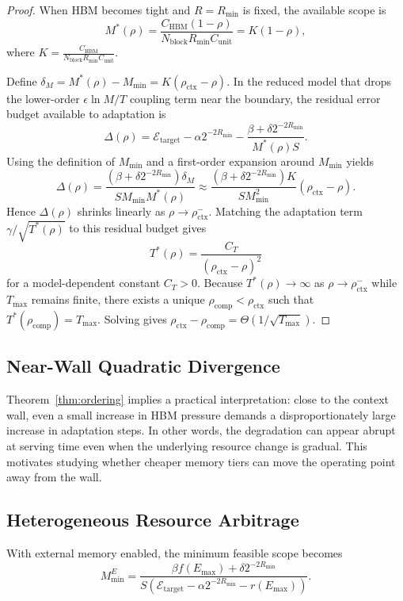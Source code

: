 \documentclass[11pt,a4paper]{article}
\theoremstyle{plain}
\theoremstyle{definition}
\begin{document}
\begin{proof}
When HBM becomes tight and $R=R_{\min}$ is fixed, the available scope is
\[
M^*(\rho) = \frac{C_{\text{HBM}}(1-\rho)}{N_{\text{block}}R_{\min}C_{\text{unit}}} = K(1-\rho),
\]
where $K = \frac{C_{\text{HBM}}}{N_{\text{block}}R_{\min}C_{\text{unit}}}$.

Define $\delta_M = M^*(\rho)-M_{\min} = K(\rho_{\text{ctx}}-\rho)$. In the reduced model that drops the lower-order $\epsilon \ln M / T$ coupling term near the boundary, the residual error budget available to adaptation is
\[
\Delta(\rho) = \mathcal{E}_{\text{target}} - \alpha 2^{-2R_{\min}} - \frac{\beta + \delta 2^{-2R_{\min}}}{M^*(\rho)S}.
\]
Using the definition of $M_{\min}$ and a first-order expansion around $M_{\min}$ yields
\[
\Delta(\rho) = \frac{(\beta + \delta 2^{-2R_{\min}})\delta_M}{S M_{\min}M^*(\rho)}
\approx \frac{(\beta + \delta 2^{-2R_{\min}})K}{S M_{\min}^2}(\rho_{\text{ctx}}-\rho).
\]
Hence $\Delta(\rho)$ shrinks linearly as $\rho \to \rho_{\text{ctx}}^{-}$. Matching the adaptation term $\gamma/\sqrt{T^*(\rho)}$ to this residual budget gives
\[
T^*(\rho)=\frac{C_T}{(\rho_{\text{ctx}}-\rho)^2}
\]
for a model-dependent constant $C_T>0$. Because $T^*(\rho)\to\infty$ as $\rho\to\rho_{\text{ctx}}^{-}$ while $T_{\max}$ remains finite, there exists a unique $\rho_{\text{comp}}<\rho_{\text{ctx}}$ such that $T^*(\rho_{\text{comp}})=T_{\max}$. Solving gives $\rho_{\text{ctx}}-\rho_{\text{comp}}=\Theta(1/\sqrt{T_{\max}})$.
\end{proof}

\subsection{Near-Wall Quadratic Divergence}
\label{sec:quadratic}
Theorem~\ref{thm:ordering} implies a practical interpretation: close to the context wall, even a small increase in HBM pressure demands a disproportionately large increase in adaptation steps. In other words, the degradation can appear abrupt at serving time even when the underlying resource change is gradual. This motivates studying whether cheaper memory tiers can move the operating point away from the wall.

\subsection{Heterogeneous Resource Arbitrage}
\label{sec:arbitrage}
With external memory enabled, the minimum feasible scope becomes
\begin{equation}
M_{\min}^E = \frac{\beta f(E_{\max}) + \delta 2^{-2R_{\min}}}{S(\mathcal{E}_{\text{target}} - \alpha 2^{-2R_{\min}} - r(E_{\max}))}.
\label{eq:MminE}
\end{equation}
\end{document}
